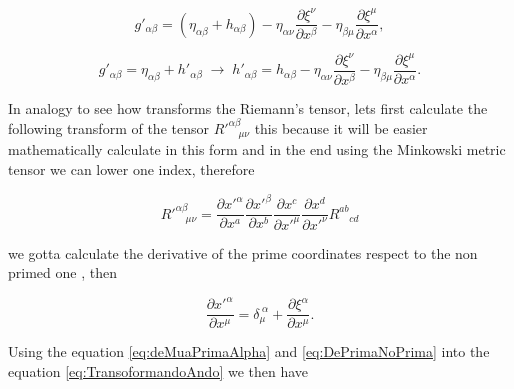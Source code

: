     \begin{equation}
        g'_{\alpha\beta} = \left(\eta_{\alpha\beta} + h_{\alpha\beta} \right) - \eta_{\alpha\nu}\frac{\partial\xi^{\nu}}{\partial x^{\beta}} - \eta_{\beta\mu}\frac{\partial\xi^{\mu}}{\partial x^{\alpha}},
    \end{equation}

    \begin{equation}
        g'_{\alpha\beta} = \eta_{\alpha\beta}+h'_{\alpha\beta}\;\rightarrow\; h'_{\alpha\beta} = h_{\alpha\beta} - \eta_{\alpha\nu}\frac{\partial\xi^{\nu}}{\partial x^{\beta}} - \eta_{\beta\mu}\frac{\partial \xi^{\mu}}{\partial x^{\alpha}}.
    \end{equation}


    In analogy to see how transforms the Riemann's tensor, lets first calculate the following transform of the tensor $R'^{\alpha\beta}_{\quad\mu\nu}$ this because it will be easier mathematically calculate in this form and in the end using the Minkowski metric tensor we can lower one index, therefore

    \begin{equation}\label{eq:TransoformandoAndo}
        R'^{\alpha\beta}_{\quad\mu\nu} = \frac{\partial x'^{\alpha}}{\partial x^{a}}\frac{\partial x'^{\beta}}{\partial x^{b}}\frac{\partial x^c}{\partial x'^{\mu}}\frac{\partial x^{d}}{\partial x'^{\nu}}R^{ab}_{\quad cd}
    \end{equation}

    we gotta calculate the derivative of the prime coordinates respect to the non primed one , then

    \begin{equation}\label{eq:DePrimaNoPrima}
        \frac{\partial x'^{\alpha}}{\partial x^{\mu}} = \delta_{\mu}^{\;\alpha} + \frac{\partial \xi^{\alpha}}{\partial x^{\mu}}.
    \end{equation}

    Using the equation \ref{eq:deMuaPrimaAlpha} and \ref{eq:DePrimaNoPrima} into the equation \ref{eq:TransoformandoAndo} we then have

